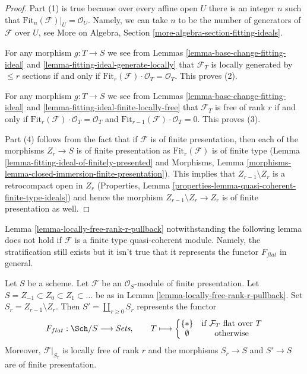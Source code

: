 \begin{proof}
Part (1) is true because over every affine open $U$ there is an integer $n$
such that $\text{Fit}_n(\mathcal{F})|_U = \mathcal{O}_U$. Namely, we can
take $n$ to be the number of generators of $\mathcal{F}$ over $U$, see
More on Algebra, Section \ref{more-algebra-section-fitting-ideals}.

\medskip\noindent
For any morphism $g : T \to S$ we see from
Lemmas \ref{lemma-base-change-fitting-ideal} and
\ref{lemma-fitting-ideal-generate-locally}
that $\mathcal{F}_T$ is locally generated by $\leq r$ sections if and only if
$\text{Fit}_r(\mathcal{F}) \cdot \mathcal{O}_T = \mathcal{O}_T$.
This proves (2).

\medskip\noindent
For any morphism $g : T \to S$ we see from
Lemmas \ref{lemma-base-change-fitting-ideal} and
\ref{lemma-fitting-ideal-finite-locally-free}
that $\mathcal{F}_T$ is free of rank $r$ if and only if
$\text{Fit}_r(\mathcal{F}) \cdot \mathcal{O}_T = \mathcal{O}_T$ and
$\text{Fit}_{r - 1}(\mathcal{F}) \cdot \mathcal{O}_T = 0$.
This proves (3).

\medskip\noindent
Part (4) follows from the fact that if
$\mathcal{F}$ is of finite presentation, then each of the morphisms
$Z_r \to S$ is of finite presentation as $\text{Fit}_r(\mathcal{F})$
is of finite type (Lemma \ref{lemma-fitting-ideal-of-finitely-presented} and
Morphisms, Lemma \ref{morphisms-lemma-closed-immersion-finite-presentation}).
This implies that $Z_{r - 1} \setminus Z_r$ is a retrocompact open in $Z_r$
(Properties, Lemma \ref{properties-lemma-quasi-coherent-finite-type-ideals})
and hence the morphism $Z_{r - 1} \setminus Z_r \to Z_r$
is of finite presentation as well.
\end{proof}

\noindent
Lemma \ref{lemma-locally-free-rank-r-pullback} notwithstanding
the following lemma does not hold if $\mathcal{F}$ is a finite type
quasi-coherent module. Namely, the stratification still exists but
it isn't true that it represents the functor $F_{flat}$ in general.

\begin{lemma}
\label{lemma-finite-presentation-module}
Let $S$ be a scheme. Let $\mathcal{F}$ be an $\mathcal{O}_S$-module
of finite presentation. Let $S = Z_{-1} \subset Z_0 \subset Z_1 \subset \ldots$
be as in Lemma \ref{lemma-locally-free-rank-r-pullback}.
Set $S_r = Z_{r - 1} \setminus Z_r$.
Then $S' = \coprod_{r \geq 0} S_r$ represents the functor
$$
F_{flat} : \Sch/S \longrightarrow \textit{Sets},\quad\quad
T \longmapsto
\left\{
\begin{matrix}
\{*\} & \text{if }\mathcal{F}_T\text{ flat over }T\\
\emptyset & \text{otherwise}
\end{matrix}
\right.
$$
Moreover, $\mathcal{F}|_{S_r}$ is locally free of rank $r$ and the
morphisms $S_r \to S$ and $S' \to S$ are of finite presentation.
\end{lemma}

